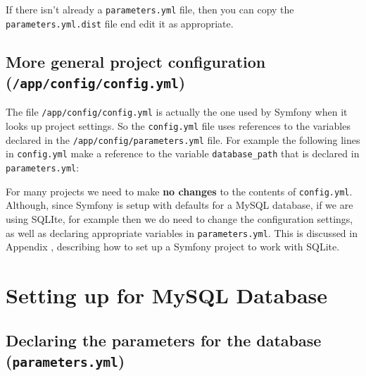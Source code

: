 \documentclass[a4paperpaper,openright]{book}
\newenvironment{Shaded}{}{}
\newcommand{\AttributeTok}[1]{\textcolor[rgb]{0.49,0.56,0.16}{#1}}
\newcommand{\FunctionTok}[1]{\textcolor[rgb]{0.02,0.16,0.49}{#1}}
\newcommand{\StringTok}[1]{\textcolor[rgb]{0.25,0.44,0.63}{#1}}
\begin{document}
If there isn't already a \texttt{parameters.yml} file, then you can copy
the \texttt{parameters.yml.dist} file end edit it as appropriate.

\hypertarget{more-general-project-configuration-appconfigconfig.yml}{%
\section{\texorpdfstring{More general project configuration
(\texttt{/app/config/config.yml})}{More general project configuration (/app/config/config.yml)}}\label{more-general-project-configuration-appconfigconfig.yml}}

The file \texttt{/app/config/config.yml} is actually the one used by
Symfony when it looks up project settings. So the \texttt{config.yml}
file uses references to the variables declared in the
\texttt{/app/config/parameters.yml} file. For example the following
lines in \texttt{config.yml} make a reference to the variable
\texttt{database\_path} that is declared in \texttt{parameters.yml}:

\begin{Shaded}
\end{Shaded}

For many projects we need to make \textbf{no changes} to the contents of
\texttt{config.yml}. Although, since Symfony is setup with defaults for
a MySQL database, if we are using SQLIte, for example then we do need to
change the configuration settings, as well as declaring appropriate
variables in \texttt{parameters.yml}. This is discussed in Appendix
\label{appendix_db_sqlite}, describing how to set up a Symfony project
to work with SQLite.

\hypertarget{setting-up-for-mysql-database}{%
\chapter{\texorpdfstring{Setting up for MySQL Database
\label{appendix_db_mysql}}{Setting up for MySQL Database }}\label{setting-up-for-mysql-database}}

\hypertarget{declaring-the-parameters-for-the-database-parameters.yml}{%
\section{\texorpdfstring{Declaring the parameters for the database
(\texttt{parameters.yml})}{Declaring the parameters for the database (parameters.yml)}}\label{declaring-the-parameters-for-the-database-parameters.yml}}
\end{document}
